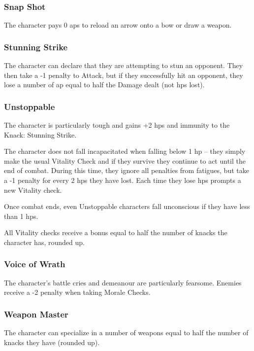 \begin{multicols}{2}
\subsubsection{Snap Shot}

The character pays 0 \glspl{ap} to reload an arrow onto a bow or draw a weapon.

\subsubsection{Stunning Strike}\label{stunningstrike}

The character can declare that they are attempting to stun an opponent.
They then take a -1 penalty to Attack, but if they successfully hit an opponent, they lose a number of \gls{ap} equal to half the Damage dealt (not \glspl{hp} lost).

\subsubsection{Unstoppable}

The character is particularly tough and gains +2 \glspl{hp} and immunity to the Knack: Stunning Strike.

The character does not fall incapacitated when falling below 1 \gls{hp} -- they simply make the usual Vitality Check and if they survive they continue to act until the end of combat.
 During this time, they ignore all penalties from \glspl{fatigue}, but take a -1 penalty for every 2 \glspl{hp} they have lost.
Each time they lose \glspl{hp} prompts a new Vitality check.

Once combat ends, even Unstoppable characters fall unconscious if they have less than 1 \glspl{hp}.

All Vitality checks receive a bonus equal to half the number of knacks the character has, rounded up.

\subsubsection{Voice of Wrath}

The character's battle cries and demeanour are particularly fearsome.
Enemies receive a -2 penalty when taking Morale Checks.

\subsubsection{Weapon Master}

\iftoggle{verbose}{
  The character has trained long and hard with a particular weapon, such as a longsword, spear, shortbow, or rocks.
  They gain +1 to your Combat or Projectiles Bonus when using that weapon.
  
}{
  The character gains +1 to the Combat or Projectiles score when using a specialized weapon.
}%
  The character can specialize in a number of weapons equal to half the number of knacks they have (rounded up).

\end{multicols}

